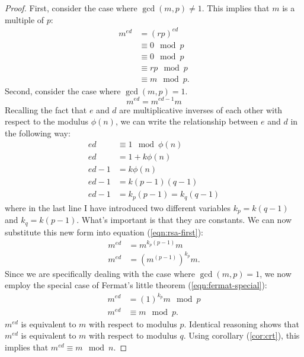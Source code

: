 \documentclass[]{scrartcl}
\theoremstyle{definition}
\let\oldref\ref
\renewcommand{\ref}[1]{(\oldref{#1})}
\begin{document}
\begin{proof}
    First, consider the case where $\gcd(m,p) \neq 1$. This implies that $m$ is a multiple of $p$:
    \begin{align*}
        m^{ed} &=(rp)^{ed} \\
        &\equiv 0 \mod p \\
        &\equiv 0 \mod p \\
        &\equiv rp \mod p \\
        &\equiv m \mod p.
    \end{align*}
    Second, consider the case where $\gcd(m,p)=1$. 
    \begin{equation}\label{eqn:rsa-first}
        m^{ed} = m^{ed-1}m
    \end{equation}
    Recalling the fact that $e$ and $d$ are multiplicative inverses of each other with respect to the modulus $\phi(n)$, we can write the relationship between $e$ and $d$ in the following way:
    \begin{align*}
        ed &\equiv 1 \mod \phi(n) \\
        ed &=1 + k\phi(n) \\
        ed - 1 &= k\phi(n) \\
        ed - 1 &= k(p-1)(q-1) \\
        ed - 1 &= k_p(p-1) = k_q(q-1)
    \end{align*}
    where in the last line I have introduced two different variables $k_p = k(q-1)$ and $k_q=k(p-1)$. What's important is that they are constants. We can now substitute this new form into equation \ref{eqn:rsa-first}:
    \begin{align*}
        m^{ed} &= m^{k_p(p-1)}m \\
        m^{ed} &= \left(m^{(p-1)}\right)^{k_p}m.
    \end{align*}
    Since we are specifically dealing with the case where $\gcd(m, p)=1$, we now employ the special case of Fermat's little theorem \ref{eqn:fermat-special}:
    \begin{align*}
        m^{ed} &= (1)^{k_p}m \mod p \\
        m^{ed} &\equiv m \mod p.
    \end{align*}
    $m^{ed}$ is equivalent to $m$ with respect to modulus $p$. Identical reasoning shows that $m^{ed}$ is equivalent to $m$ with respect to modulus $q$. Using corollary \ref{cor:crt}, this implies that $m^{ed} \equiv m \mod n$.
\end{proof}
\end{document}
